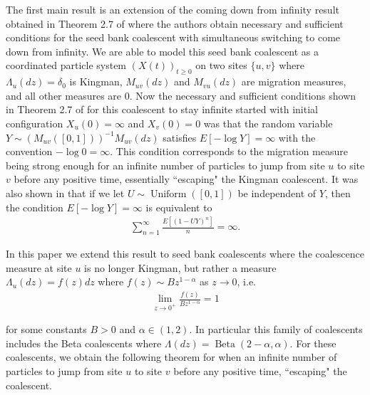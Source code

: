 \documentclass[11pt]{article}
\theoremstyle{definition}
\newcommand{\Beta}{\operatorname{Beta}}
\begin{document}
\noindent The first main result is an extension of the coming down from infinity result obtained in Theorem 2.7 of \cite{seedbank2} where the authors obtain necessary and sufficient conditions for the seed bank coalescent with simultaneous switching to come down from infinity. We are able to model this seed bank coalescent as a coordinated particle system $(X(t))_{t \geq 0}$ on two sites $\{u,v\}$ where $\Lambda_u(dz) = \delta_0$ is Kingman, $M_{uv}(dz)$ and $M_{vu}(dz)$ are migration measures, and all other measures are $0$. Now the necessary and sufficient conditions shown in Theorem 2.7 of \cite{seedbank2} for this coalescent to stay infinite started with initial configuration $X_u(0) = \infty$ and $X_v(0) = 0$ was that the random variable $Y \sim (M_{uv}([0,1]))^{-1}M_{uv}(dz)$ satisfies $E[-\log Y] = \infty$ with the convention $-\log 0 = \infty$. This condition corresponds to the migration measure being strong enough for an infinite number of particles to jump from site $u$ to site $v$ before any positive time, essentially ``escaping" the Kingman coalescent. It was also shown in \cite{seedbank2} that if we let $U \sim \operatorname{Uniform}([0,1])$ be independent of $Y$, then the condition $E[-\log Y] = \infty$ is equivalent to
%
\begin{align*}
    \sum_{n = 1}^\infty \frac{E[(1-UY)^n]}{n} = \infty.
\end{align*}

\noindent In this paper we extend this result to seed bank coalescents where the coalescence measure at site $u$ is no longer Kingman, but rather a measure $\Lambda_u(dz) = f(z)dz$ where $f(z) \sim Bz^{1-\alpha}$ as $z \to 0$, i.e.
%
\begin{align*}
    \lim_{z \to 0^+}\frac{f(z)}{Bz^{1-\alpha}} = 1
\end{align*}

\noindent for some constants $B > 0$ and $\alpha \in (1,2)$. In particular this family of coalescents includes the Beta coalescents where $\Lambda(dz) = \Beta(2-\alpha, \alpha)$. For these coalescents, we obtain the following theorem for when an infinite number of particles to jump from site $u$ to site $v$ before any positive time, ``escaping" the coalescent.
\end{document}
